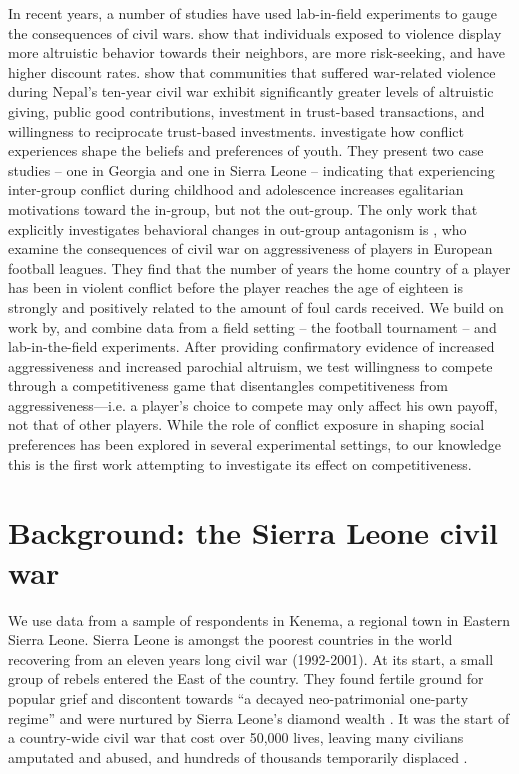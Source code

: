 In recent years, a number of studies have used lab-in-field experiments to gauge the consequences of civil wars. \cite{Voors2012} show that individuals exposed to violence display more altruistic behavior towards their neighbors, are more risk-seeking, and have higher discount rates. \cite{Gilligan2014} show that communities that suffered war-related violence during Nepal's ten-year civil war exhibit significantly greater levels of altruistic giving, public good contributions, investment in trust-based transactions, and willingness to reciprocate trust-based investments. \cite{Bauer2014} investigate how conflict experiences shape the beliefs and preferences of youth. They present two case studies – one in Georgia and one in Sierra Leone – indicating that experiencing inter-group conflict during childhood and adolescence increases egalitarian motivations toward the in-group, but not the out-group. The only work that explicitly investigates behavioral changes in out-group antagonism is \cite{Miguel2011b}, who examine the consequences of civil war on aggressiveness of players in European football leagues. They find that the number of years the home country of a player has been in violent conflict before the player reaches the age of eighteen is strongly and positively related to the amount of foul cards received. 
We build on work by\cite{Miguel2011b}, and combine data from a field setting – the football tournament – and lab-in-the-field experiments. After providing confirmatory evidence of increased aggressiveness and increased parochial altruism, we test willingness to compete through a competitiveness game that disentangles competitiveness from aggressiveness—i.e. a player’s choice to compete may only affect his own payoff, not that of other  players. While the role of conflict exposure in shaping social preferences has been explored in several experimental settings, to our knowledge this is the first work attempting to investigate its effect on competitiveness.

\section{Background: the Sierra Leone civil war}
\label{sec:slf:ackground}
We use data from a sample of respondents in Kenema, a regional town in Eastern Sierra Leone. Sierra Leone is amongst the poorest countries in the world recovering from an eleven years long civil war (1992-2001). At its start, a small group of rebels entered the East of the country. They found fertile ground for popular grief and discontent towards “a decayed neo-patrimonial one-party regime” \citep{Richards1999} and were nurtured by Sierra Leone’s diamond wealth \citep{Keen2005a}. It was the start of a country-wide civil war that cost over 50,000 lives, leaving many civilians amputated and abused, and hundreds of thousands temporarily displaced \citep{HumanRightsWatch1999a,Doucet2012a}.

